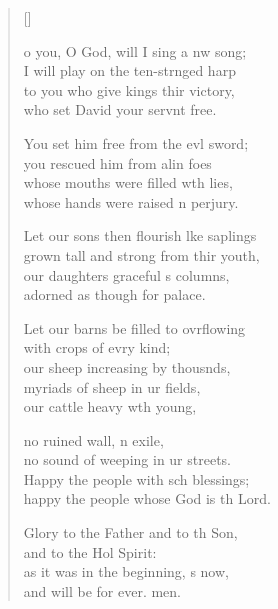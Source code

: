 \settowidth{\versewidth}{Let our sons then flourish like saplings *}
\begin{verse}[\versewidth]
  \begin{patverse}
o you, O God, will I sing a nw song;\Med\\
I will play on the ten-str\pointup{\i}nged harp\\
to you who give kings thir victory,\Med\\
who set David your servnt free.

You set him free from the ev\pointup{\i}l sword;\Med\\
you rescued him from alin foes\\
whose mouths were filled w\pointup{\i}th lies,\Med\\
whose hands were raised \pointup{\i}n perjury.

Let our sons then flourish l\pointup{\i}ke saplings\Med\\
grown tall and strong from thir youth,\\
our daughters graceful s columns,\Med\\
adorned as though for  palace.

Let our barns be filled to ovrflowing\Med\\
with crops of evry kind;\\
our sheep increasing by thousnds,\Flex\\
myriads of sheep in ur fields,\Med\\
our cattle heavy w\pointup{\i}th young,

no ruined wall, n exile,\Med\\
no sound of weeping in ur streets.\\
Happy the people with sch blessings;\Med\\
happy the people whose God is th Lord.

Glory to the Father and to th Son,\Med\\
and to the Hol Spirit:\\
as it was in the beginning, \pointup{\i}s now,\Med\\
and will be for ever. men.
  \end{patverse}
\end{verse}
